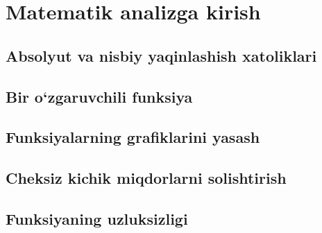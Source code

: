 \chapter{Matematik analizga kirish}
\section{Absolyut va nisbiy yaqinlashish xatoliklari}
\section{Bir o`zgaruvchili funksiya}
\section{Funksiyalarning grafiklarini yasash}
\section{Cheksiz kichik miqdorlarni solishtirish}
\section{Funksiyaning uzluksizligi}

